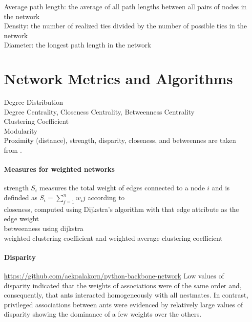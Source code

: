 Average path length: the average of all path lengths between
all pairs of nodes in the network\\

Density: the number of realized ties divided by the number
of possible ties in the network\\

Diameter: the longest path length in the network\\
\textcite{wey2008social}

\section{Network Metrics and Algorithms}
Degree Distribution\\
Degree Centrality, Closeness Centrality, Betweenness Centrality\\
Clustering Coefficient\\
Modularity\\

Proximity (distance), strength, disparity, closeness, and betweennes are taken from \textcite{jeanson2012long}.\\

\paragraph*{Measures for weighted networks}
strength $S_i$ measures the total weight of edges connected to a node $i$ and is definded as $S_i = \sum_{j=1}^{n}w_ij$ according to~\textcite{barrat2004architecture}\\
closeness, computed using Dijkstra’s algorithm with that edge attribute as the edge weight~\cite{newman2001scientific}\\
betweenness using dijkstra~\cite{brandes2001faster}\\

weighted clustering coefficient and weighted average clustering coefficient~\cite{saramaki2007generalizations}\\

\paragraph*{Disparity}
\url{https://github.com/aekpalakorn/python-backbone-network}
Low values of disparity indicated that the weights of associations were of the same order and, consequently, that ants interacted homogeneously with all nestmates. In contrast, privileged associations between ants were evidenced by relatively large values of disparity showing the dominance of a few weights over the others.~\cite{barthelemy2005characterization}

